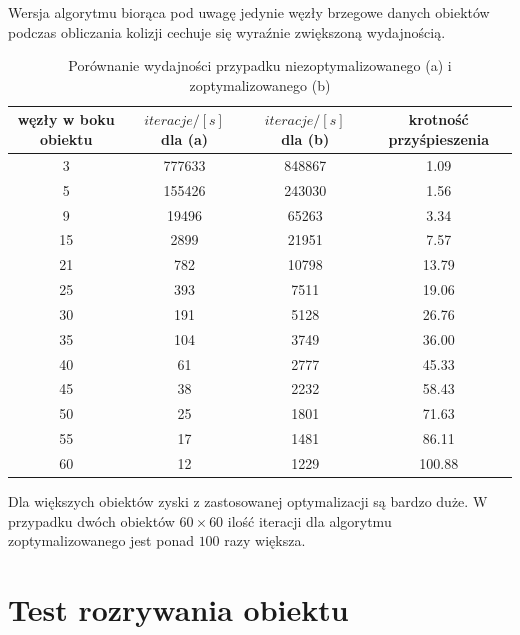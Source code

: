 \documentclass[12pt, letterpaper]{report}
\begin{document}
    Wersja algorytmu biorąca pod uwagę jedynie węzły brzegowe danych obiektów podczas obliczania kolizji cechuje 
    się wyraźnie zwiększoną wydajnością.

    \begin{table}[H]
        \centering
        \begin{tabular}{||c c c c||} 
            \hline
            węzły w boku obiektu & $iteracje / [s]$ dla (a) & $iteracje / [s]$ dla (b) & krotność przyśpieszenia \\ [0.5ex] 
            \hline\hline
            3 & 777633 & 848867 & 1.09 \\ 
            \hline
            5 & 155426 & 243030 & 1.56 \\
            \hline
            9 & 19496 & 65263 & 3.34 \\
            \hline
            15 & 2899 & 21951 & 7.57 \\
            \hline
            21 & 782 & 10798 & 13.79 \\
            \hline
            25 & 393 & 7511 & 19.06 \\
            \hline
            30 & 191 & 5128 & 26.76 \\
            \hline
            35 & 104 & 3749 & 36.00 \\
            \hline
            40 & 61 & 2777 & 45.33 \\ 
            \hline
            45 & 38 & 2232 & 58.43 \\ 
            \hline
            50 & 25 & 1801 & 71.63 \\
            \hline
            55 & 17 & 1481 & 86.11 \\ 
            \hline
            60 & 12 & 1229 & 100.88 \\ [1ex] 
            \hline
        \end{tabular}
        \caption{ Porównanie wydajności przypadku niezoptymalizowanego (a) i zoptymalizowanego (b) }
    \end{table}
    Dla większych obiektów zyski z zastosowanej optymalizacji są bardzo duże. W przypadku dwóch obiektów
    $60 \times 60$ ilość iteracji dla algorytmu zoptymalizowanego jest ponad $100$ razy większa.
        
    \section{Test rozrywania obiektu}
\end{document}
